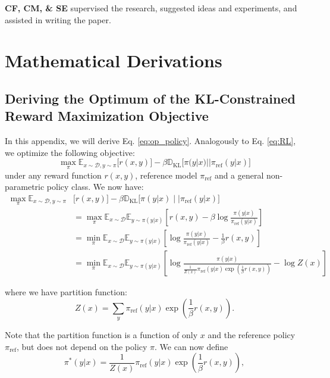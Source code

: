 \documentclass{article}
\newcommand{\piref}{\pi_\text{ref}}
\begin{document}
\textbf{CF, CM, \& SE} supervised the research, suggested ideas and experiments, and assisted in writing the paper.

\section{Mathematical Derivations}
\subsection{Deriving the Optimum of the KL-Constrained Reward Maximization Objective}
In this appendix, we will derive Eq. \ref{eq:op_policy}. Analogously to Eq. \ref{eq:RL}, we optimize the following objective:
\begin{equation}
\max_{\pi}  \mathbb{E}_{x\sim \mathcal{D}, y\sim \pi}\bigl[r(x, y)\bigr] - \beta\mathbb{D}_{\textrm{KL}}\bigl[\pi(y|x)||\piref(y|x)\bigr]
\end{equation}
under any reward function $r(x,y)$, reference model $\piref$ and a general non-parametric policy class. We now have:
\begin{align}\label{eq:RL_proof}
\max_{\pi}  \mathbb{E}_{x\sim \mathcal{D}, y\sim \pi}&\bigl[r(x, y)\bigr] - \beta\mathbb{D}_{\textrm{KL}}\bigl[\pi(y|x)\mid\mid\piref(y|x)\bigr] \nonumber\\
&=\max_{\pi}  \mathbb{E}_{x\sim \mathcal{D}}\mathbb{E}_{y\sim \pi(y|x)}\left[r(x, y) - \beta\log\frac{\pi(y|x)}{\piref(y|x)}\right] \nonumber\\&=
\min_{\pi}  \mathbb{E}_{x\sim \mathcal{D}}\mathbb{E}_{y\sim \pi(y|x)}\left[\log\frac{\pi(y|x)}{\piref(y|x)} - \frac{1}{\beta}r(x, y)\right] \nonumber\\ &=
\min_{\pi}  \mathbb{E}_{x\sim \mathcal{D}}\mathbb{E}_{y\sim \pi(y|x)}\left[\log\frac{\pi(y|x)}{\frac{1}{Z(x)}\piref(y|x)\exp\left(\frac{1}{\beta}r(x, y)\right)} - \log Z(x)\right]
\end{align}

where we have partition function:
\begin{equation*}
Z(x) = \sum_{y}\piref(y|x)\exp\left(\frac{1}{\beta}r(x, y)\right).
\end{equation*}

Note that the partition function is a function of only $x$ and the reference policy $\piref$, but does not depend on the policy $\pi$. We can now define
\begin{equation*}
    \pi^*(y|x) = \frac{1}{Z(x)}\piref(y|x)\exp\left(\frac{1}{\beta}r(x, y)\right),
\end{equation*}
\end{document}
